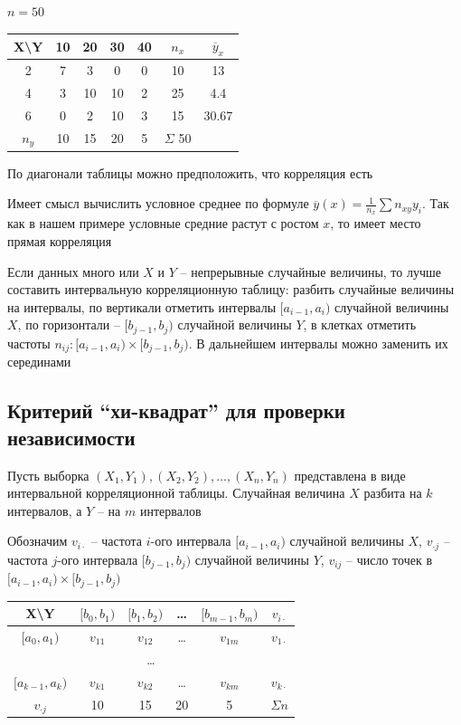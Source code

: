 \documentclass[12pt]{article}
\begin{document}
\Ex $n = 50$

\smallvspace

\begin{tabular}{c|c|c|c|c|c|c}
    X\backslash Y & 10 & 20 & 30 & 40 & $n_x$ & $\overline y_x$ \\
    \hline
    2 & 7 & 3 & 0 & 0 & 10 & 13 \\
    \hline
    4 & 3 & 10 & 10 & 2 & 25 & 4.4 \\
    \hline
    6 & 0 & 2 & 10 & 3 & 15 & 30.67 \\
    \hline
    $n_y$ & 10 & 15 & 20 & 5 & $\Sigma$ 50 & \\
\end{tabular}

\smallvspace

По диагонали таблицы можно предположить, что корреляция есть

Имеет смысл вычислить условное среднее по формуле $\overline y (x) = \frac{1}{n_x} \sum n_{xy} y_i$. Так как в нашем примере
условные средние растут с ростом $x$, то имеет место прямая корреляция

\Nota Если данных много или $X$ и $Y$ -- непрерывные случайные величины, то лучше составить интервальную корреляционную таблицу:
разбить случайные величины на интервалы, по вертикали отметить интервалы $[a_{i - 1}, a_i)$ случайной величины $X$, 
по горизонтали -- $[b_{j - 1}, b_j)$ случайной величины $Y$, в клетках 
отметить частоты $n_{ij} : [a_{i - 1}, a_i) \times [b_{j - 1}, b_j)$. В дальнейшем интервалы можно заменить их серединами

\hypertarget{chi_square_independence_criterion}{}

\subsection{Критерий \enquote{хи-квадрат} для проверки независимости}

Пусть выборка $(X_1, Y_1), (X_2, Y_2), \dots, (X_n, Y_n)$ представлена в виде интервальной корреляционной таблицы. Случайная величина $X$ 
разбита на $k$ интервалов, а $Y$ -- на $m$ интервалов

Обозначим $v_{i\cdot}$ -- частота $i$-ого интервала $[a_{i - 1}, a_i)$ случайной величины $X$, 
$v_{\cdot j}$ -- частота $j$-ого интервала $[b_{j - 1}, b_j)$ случайной величины $Y$, $v_{ij}$ -- число точек в $[a_{i - 1}, a_i) \times [b_{j - 1}, b_j)$


\begin{tabular}{c|c|c|c|c|c}
    X\backslash Y & $[b_0, b_1)$ & $[b_1, b_2)$ & \dots & $[b_{m - 1}, b_m)$ & $v_{i\cdot}$ \\
    \hline
    $[a_0, a_1)$ & $v_{11}$ & $v_{12}$ & \dots & $v_{1m}$ & $v_{1\cdot}$ \\
    \hline
    \multicolumn{6}{c}{\dots} \\
    \hline
    $[a_{k - 1}, a_k)$ & $v_{k1}$ & $v_{k2}$ & \dots & $v_{km}$ & $v_{k\cdot}$ \\
    \hline
    $v_{\cdot j}$ & 10 & 15 & 20 & 5 & $\Sigma n$ \\
\end{tabular}
\end{document}
